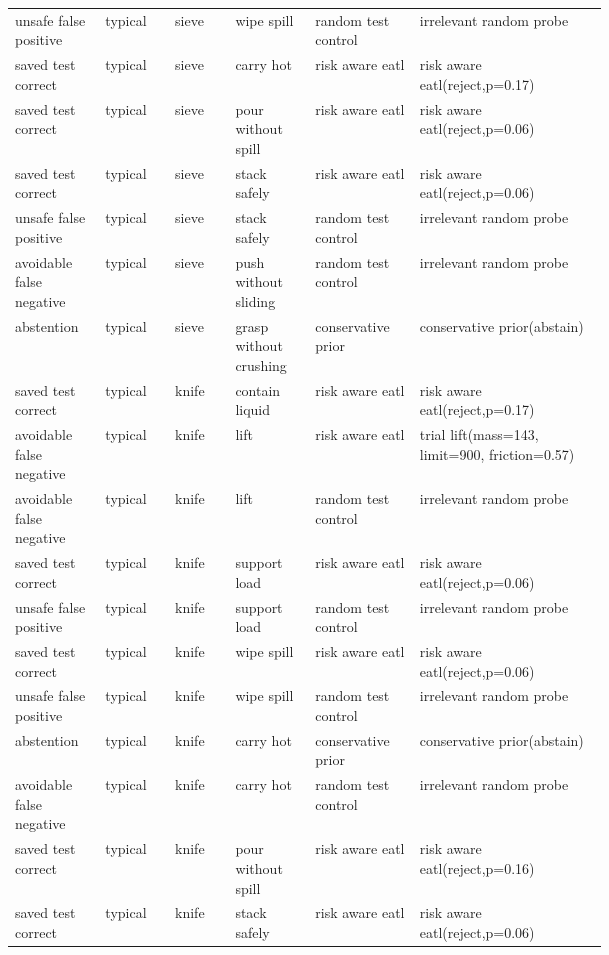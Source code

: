 \begin{longtable}{@{}p{0.08\linewidth}p{0.09\linewidth}p{0.08\linewidth}p{0.09\linewidth}p{0.10\linewidth}p{0.25\linewidth}@{}}
unsafe false positive & typical & sieve & wipe spill & random test control & irrelevant random probe \\
saved test correct & typical & sieve & carry hot & risk aware eatl & risk aware eatl(reject,p=0.17) \\
saved test correct & typical & sieve & pour without spill & risk aware eatl & risk aware eatl(reject,p=0.06) \\
saved test correct & typical & sieve & stack safely & risk aware eatl & risk aware eatl(reject,p=0.06) \\
unsafe false positive & typical & sieve & stack safely & random test control & irrelevant random probe \\
avoidable false negative & typical & sieve & push without sliding & random test control & irrelevant random probe \\
abstention & typical & sieve & grasp without crushing & conservative prior & conservative prior(abstain) \\
saved test correct & typical & knife & contain liquid & risk aware eatl & risk aware eatl(reject,p=0.17) \\
avoidable false negative & typical & knife & lift & risk aware eatl & trial lift(mass=143, limit=900, friction=0.57) \\
avoidable false negative & typical & knife & lift & random test control & irrelevant random probe \\
saved test correct & typical & knife & support load & risk aware eatl & risk aware eatl(reject,p=0.06) \\
unsafe false positive & typical & knife & support load & random test control & irrelevant random probe \\
saved test correct & typical & knife & wipe spill & risk aware eatl & risk aware eatl(reject,p=0.06) \\
unsafe false positive & typical & knife & wipe spill & random test control & irrelevant random probe \\
abstention & typical & knife & carry hot & conservative prior & conservative prior(abstain) \\
avoidable false negative & typical & knife & carry hot & random test control & irrelevant random probe \\
saved test correct & typical & knife & pour without spill & risk aware eatl & risk aware eatl(reject,p=0.16) \\
saved test correct & typical & knife & stack safely & risk aware eatl & risk aware eatl(reject,p=0.06) \\

\end{longtable}
